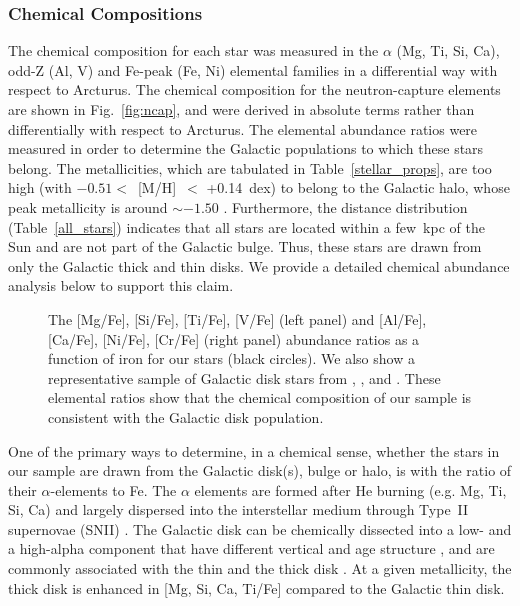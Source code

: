 \documentclass[modern]{aastex62}
\begin{document}
\subsubsection{Chemical Compositions}
\label{chemical}
The chemical composition for each star was measured in the $\alpha$ (Mg, Ti, Si, Ca), odd-Z (Al, V) and Fe-peak (Fe, Ni) elemental families in a differential way with respect to Arcturus. The chemical composition for the neutron-capture elements are shown in Fig.~\ref{fig:ncap}, and were derived in absolute terms rather than differentially with respect to Arcturus. The elemental abundance ratios were measured in order to determine the Galactic populations to which these stars belong. The metallicities, which are tabulated in Table~\ref{stellar_props}, are too high (with $-0.51<$~[M/H]~$<$ +0.14~dex) to belong to the Galactic halo, whose peak metallicity is around $\sim -1.50$ \cite[e.g.][]{Chiba2000}. Furthermore, the distance distribution (Table~\ref{all_stars}) indicates that all stars are located within a few~kpc of the Sun and are not part of the Galactic bulge. Thus, these stars are drawn from only the Galactic thick and thin disks. We provide a detailed chemical abundance analysis below to support this claim.\\


\begin{figure*}

\caption{\label{alphael}
The [Mg/Fe], [Si/Fe], [Ti/Fe], [V/Fe] (left panel) and [Al/Fe], [Ca/Fe], [Ni/Fe], [Cr/Fe] (right panel) abundance ratios as a function of iron for our stars (black circles). We also show a representative sample of Galactic disk stars from \citet[open red squares]{Bensby2014}, \citet[open blue squares]{Adibekyan2012}, and \citet[teal circles]{Battistini2015}. These elemental ratios show that the chemical composition of our sample is consistent with the Galactic disk population. } %
\end{figure*}

One of the primary ways to determine, in a chemical sense, whether the stars in our sample are drawn from the Galactic disk(s), bulge or halo, is with the ratio of their $\alpha$-elements to Fe. The $\alpha$ elements are formed after He burning (e.g. Mg, Ti, Si, Ca) and largely dispersed into the interstellar medium through Type~II supernovae (SNII) \citep{Matteucci2001}. %
The Galactic disk can be chemically dissected into a low- and a high-alpha component that have different vertical and age structure \citep[see e.g.][]{2016ApJ...823...30B,2017A&A...608L...1H,2018MNRAS.475.5487S}, and are commonly associated with the thin and the thick disk \citep[e.g.][and references therein]{Edvardsson1993, Adibekyan2012, Feltzing2013, Bensby2014}. At a given metallicity, the thick disk is enhanced in [Mg, Si, Ca, Ti/Fe] compared to the Galactic thin disk.
\end{document}
